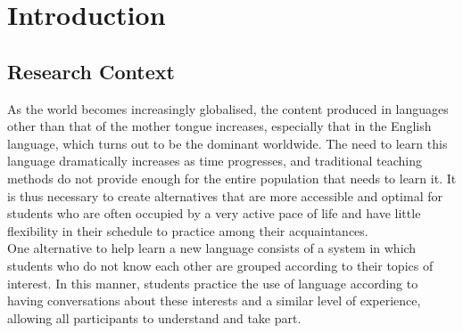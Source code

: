 \chapter{Introduction}
\label{chapter:chapter01}
\section{Research Context}
As the world becomes increasingly globalised, the content produced in languages other than that of the mother tongue increases, especially that in the English language, which turns out to be the dominant worldwide. The need to learn this language dramatically increases as time progresses, and traditional teaching methods do not provide enough for the entire population that needs to learn it. It is thus necessary to create alternatives that are more accessible and optimal for students who are often occupied by a very active pace of life and have little flexibility in their schedule to practice among their acquaintances.\\

One alternative to help learn a new language consists of a system in which students who do not know each other are grouped according to their topics of interest. In this manner, students practice the use of language according to having conversations about these interests and a similar level of experience, allowing all participants to understand and take part.\\

